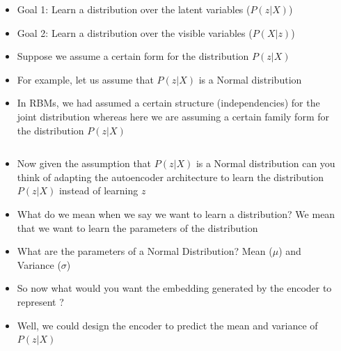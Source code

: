 \begin{frame}
	\begin{columns}
		\begin{overlayarea}{\textwidth}{\textheight}
			\vspace{3pt}
			
		\end{overlayarea}
		\begin{overlayarea}{\textwidth}{\textheight}
			\begin{itemize}\justifying
				\item<1-> Goal 1: Learn a distribution over the latent variables ($P(z|X)$)
				\item<2-> Goal 2: Learn a distribution over the visible variables ($P(X|z)$)
				\item<3-> Suppose we assume a certain form for the distribution $P(z|X)$ 
				\item<4-> For example, let us assume that $P(z|X)$ is a Normal distribution 
				\item<5-> In RBMs, we had assumed a certain structure (independencies) for the joint distribution whereas here we are assuming a certain family form for the distribution $P(z|X)$ 
			\end{itemize}
		\end{overlayarea}
	\end{columns}
\end{frame}


\begin{frame}
	\begin{columns}
		\column{0.4\textwidth}
		\begin{overlayarea}{\textwidth}{\textheight}
			\vspace{3pt}
			
		\end{overlayarea}
		\column{0.6\textwidth}
		\begin{overlayarea}{\textwidth}{\textheight}
			\begin{itemize}\justifying
				\item<1-> Now given the assumption that $P(z|X)$ is a Normal distribution can you think of adapting the autoencoder architecture to learn the distribution $P(z|X)$ instead of learning $z$
				\item<2-> What do we mean when we say we want to learn a distribution? We mean that we want to learn the parameters of the distribution
				\item<3-> What are the parameters of a Normal Distribution? Mean ($\mu$) and Variance ($\sigma$)
				\item<4-> So now what would you want the embedding generated by the encoder to represent ?
				\item<5-> Well, we could design the encoder to predict the mean and variance of $P(z|X)$
			\end{itemize}
		\end{overlayarea}
	\end{columns}
\end{frame}


